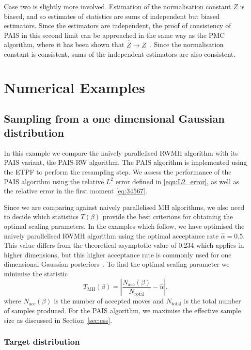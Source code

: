 \documentclass[final]{siamltex}
\begin{document}
Case two is slightly more involved. Estimation of the normalisation constant $Z$ is biased, and so estimates of statistics are sums of independent but biased estimators. Since the estimators are independent, the proof of consistency of PAIS in this second limit can be approached in the same way as the PMC algorithm, where it has been shown that $\hat{Z}\rightarrow Z$~\cite{robert2013monte}. Since the normalisation constant is consistent, sums of the independent estimators are also consistent.

\section{Numerical Examples}\label{Sec:Num}

\subsection{Sampling from a one dimensional Gaussian distribution}\label{sec:problem 1}

In this example we compare the naively parallelised RWMH algorithm with its
PAIS variant, the PAIS-RW algorithm. The PAIS algorithm is implemented using the
ETPF to perform the resampling step. We assess the performance of the PAIS algorithm
using the relative $L^2$ error defined in \eqref{eqn:L2_error}, as well as the
relative error in the first moment \eqref{eq:34567}.

Since we are comparing against naively parallelised MH algorithms,
we also need to decide which statistics $T(\beta)$ provide the best criterions
for obtaining the optimal scaling parameters. In the examples which follow, we have
optimised the naively parallelised RWMH algorithm using the optimal
acceptance rate $\hat{\alpha} = 0.5$. This value differs from the theoretical
asymptotic value of 0.234 which applies in higher dimensions, but this higher acceptance rate is commonly used for one dimensional Gaussian posteriors~\cite{rosenthal2011optimal}. To find the optimal
scaling parameter we minimise the statistic
\[
	T_{\text{MH}}(\beta) = \left| \frac{N_{\text{acc}}(\beta)}{N_{\text{total}}} - \hat{\alpha} \right|,
\]
where $N_{\text{acc}}(\beta)$ is the number of accepted moves and
$N_{\text{total}}$ is the total number of samples produced. For the
PAIS algorithm, we maximise the effective sample size as
discussed in Section~\ref{sec:ess}.

\subsubsection{Target distribution}
\end{document}
